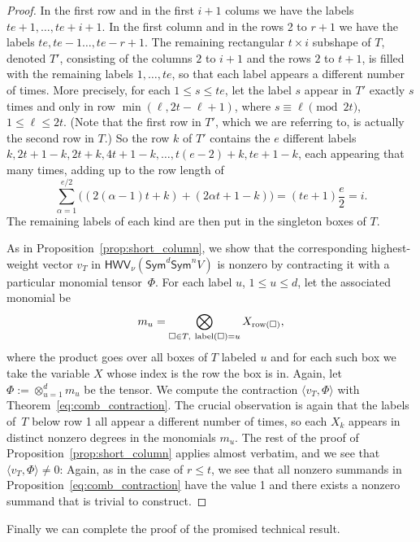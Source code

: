 \documentclass[11pt]{amsart}
\def\Sym{\mathsf{Sym}}
\newcommand{\out}{d}
\newcommand{\inn}{n}
\newcommand{\HWV}{\mathsf{HWV}}
\numberwithin{equation}{section}
\begin{document}
\begin{proof}
In the first row and in the first $i+1$ colums we have the labels $te+1,\ldots,te +i+1$.
In the first column and in the rows 2 to $r+1$ we have the labels $te,te-1\ldots,te-r+1$.
The remaining rectangular $t \times i$ subshape of $T$, denoted $T'$, 
consisting of the columns $2$ to $i+1$ and the rows $2$ to $t+1$,  
is filled with the remaining labels $1,\ldots,te$, so that each label appears a different number of times. 
More precisely, for each $1\le s \le te$, let the label $s$ appear in $T'$ exactly $s$ times and  
only in row 
$\min(\ell,2t-\ell+1)$, where $s \equiv \ell \pmod{2t}$, $1 \leq \ell \leq 2t$. 
(Note that the first row in $T'$, which we are referring to, is actually the second row in $T$.)
So the row $k$ of $T'$ contains the $e$ different labels $k, 2t+1-k, 2t+k, 4t+1-k, \ldots, t(e-2)+k, te +1-k$, 
each appearing that many times, adding up to the row length of 
$$
  \sum_{\alpha=1}^{e/2} \Big( (2(\alpha-1) t + k ) + (2\alpha t + 1 - k) \Big) 
  = (te+1)\frac{e}{2} = i . 
$$
The remaining labels of each kind are then put in the singleton boxes of $T$. 

As in Proposition~\ref{prop:short_column}, we show that the corresponding highest-weight vector $v_T$ 
in $\HWV_{\nu}(\Sym^\out \Sym^\inn V)$ is nonzero 
by contracting it with a particular monomial tensor~$\Phi$. 
For each label $u$, $1 \leq u \leq d$, let the associated monomial be
$$
  m_u = \bigotimes_{ \square \in T, \ \text{label}(\square)=u} X_{{\rm row}(\square)},
$$
where the product goes over all boxes of $T$ labeled $u$ and for each such box we take the variable $X$ 
whose index is the row the box is in. 
Again, let $\Phi:= \otimes_{u =1}^{\out} m_u$ be the tensor. 
We compute the contraction $\langle v_T, \Phi\rangle$ with Theorem~\ref{eq:comb_contraction}. 
The crucial observation is again that the labels of~$T$ below row 1 all appear a different number of times, 
so each $X_k$ appears in distinct nonzero degrees in the monomials $m_u$.
The rest of the proof of Proposition~\ref{prop:short_column} applies almost verbatim, 
and we see that $\langle v_T, \Phi \rangle \neq 0$:
Again, as in the case of $r \leq t$, we see that all nonzero summands in 
Proposition~\ref{eq:comb_contraction}
have the value 1 and there exists a nonzero summand that is trivial to construct.
\end{proof}

Finally we can complete the proof of the promised technical result. 
\end{document}

